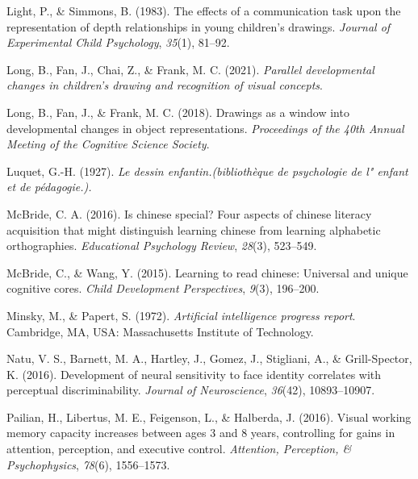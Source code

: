 \documentclass[
  man]{apa6}
\newlength{\cslhangindent}
\newlength{\cslentryspacingunit} %
\newenvironment{CSLReferences}[2] %
 {%
  \setlength{\parindent}{0pt}
  \ifodd #1
  \let\oldpar\par
  \def\par{\hangindent=\cslhangindent\oldpar}
  \fi
  \setlength{\parskip}{#2\cslentryspacingunit}
 }%
 {}
\begin{document}
\begin{CSLReferences}{1}{0}
\leavevmode{}%
Light, P., \& Simmons, B. (1983). The effects of a communication task upon the representation of depth relationships in young children's drawings. \emph{Journal of Experimental Child Psychology}, \emph{35}(1), 81--92.

\leavevmode{}%
Long, B., Fan, J., Chai, Z., \& Frank, M. C. (2021). \emph{Parallel developmental changes in children's drawing and recognition of visual concepts}.

\leavevmode{}%
Long, B., Fan, J., \& Frank, M. C. (2018). Drawings as a window into developmental changes in object representations. \emph{Proceedings of the 40th Annual Meeting of the Cognitive Science Society}.

\leavevmode{}%
Luquet, G.-H. (1927). \emph{Le dessin enfantin.(biblioth{è}que de psychologie de l" enfant et de p{é}dagogie.).}

\leavevmode{}%
McBride, C. A. (2016). Is chinese special? Four aspects of chinese literacy acquisition that might distinguish learning chinese from learning alphabetic orthographies. \emph{Educational Psychology Review}, \emph{28}(3), 523--549.

\leavevmode{}%
McBride, C., \& Wang, Y. (2015). Learning to read chinese: Universal and unique cognitive cores. \emph{Child Development Perspectives}, \emph{9}(3), 196--200.

\leavevmode{}%
Minsky, M., \& Papert, S. (1972). \emph{Artificial intelligence progress report}. Cambridge, MA, USA: Massachusetts Institute of Technology.

\leavevmode{}%
Natu, V. S., Barnett, M. A., Hartley, J., Gomez, J., Stigliani, A., \& Grill-Spector, K. (2016). Development of neural sensitivity to face identity correlates with perceptual discriminability. \emph{Journal of Neuroscience}, \emph{36}(42), 10893--10907.

\leavevmode{}%
Pailian, H., Libertus, M. E., Feigenson, L., \& Halberda, J. (2016). Visual working memory capacity increases between ages 3 and 8 years, controlling for gains in attention, perception, and executive control. \emph{Attention, Perception, \& Psychophysics}, \emph{78}(6), 1556--1573.


\end{CSLReferences}
\end{document}
